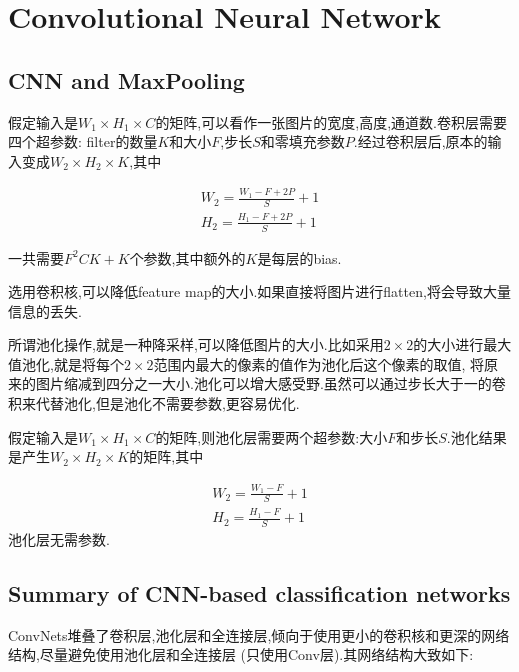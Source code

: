 \section{Convolutional Neural Network}

\subsection{CNN and MaxPooling}

假定输入是$W_1 \times H_1 \times C$的矩阵,可以看作一张图片的宽度,高度,通道数.卷积层需要四个超参数:
filter的数量$K$和大小$F$,步长$S$和零填充参数$P$.经过卷积层后,原本的输入变成$W_2 \times H_2 \times K$,其中

\begin{equation}
	\begin{split}
		W_2 = \frac{W_1 - F + 2P}{S} + 1
		\\
		H_2 = \frac{H_1 - F + 2P}{S} + 1
	\end{split}
\end{equation}

一共需要$F^2CK+K$个参数,其中额外的$K$是每层的bias.

选用卷积核,可以降低feature map的大小.如果直接将图片进行flatten,将会导致大量信息的丢失.

所谓池化操作,就是一种降采样,可以降低图片的大小.比如采用$2\times 2$的大小进行最大值池化,就是将每个$2\times 2$范围内最大的像素的值作为池化后这个像素的取值,
将原来的图片缩减到四分之一大小.池化可以增大感受野.虽然可以通过步长大于一的卷积来代替池化,但是池化不需要参数,更容易优化.

假定输入是$W_1 \times H_1 \times C$的矩阵,则池化层需要两个超参数:大小$F$和步长$S$.池化结果是产生$W_2 \times H_2 \times K$的矩阵,其中

\begin{equation}
	\begin{split}
		W_2 = \frac{W_1 - F}{S} + 1
		\\
		H_2 = \frac{H_1 - F}{S} + 1
	\end{split}
\end{equation}
池化层无需参数.

\subsection{Summary of CNN-based classification networks}

ConvNets堆叠了卷积层,池化层和全连接层,倾向于使用更小的卷积核和更深的网络结构,尽量避免使用池化层和全连接层 (只使用Conv层).其网络结构大致如下:

